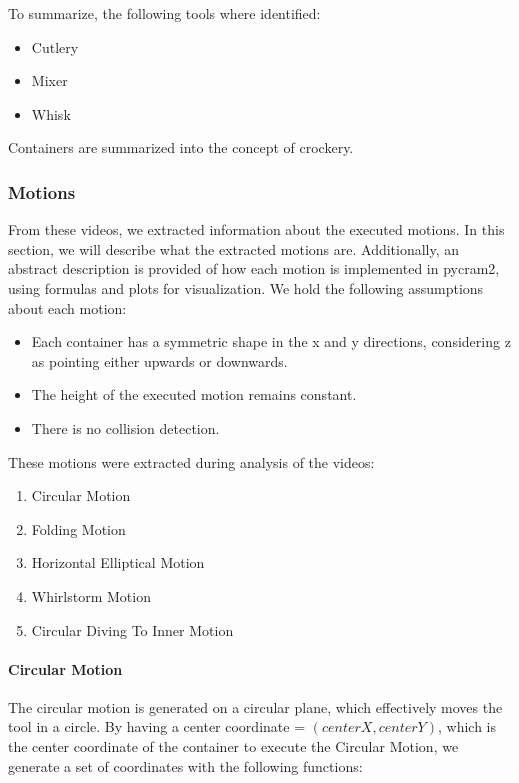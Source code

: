 To summarize, the following tools where identified: 
\begin{itemize}
  \item Cutlery
  \item Mixer
  \item Whisk
\end{itemize}

Containers are summarized into the concept of crockery. 
\subsubsection{Motions}
\label{sec:Motions}
From these videos, we extracted information about the executed motions. In this section, we will describe what the extracted motions are. 
Additionally, an abstract description is provided of how each motion is implemented in pycram2, using formulas and plots for visualization.
We hold the following assumptions about each motion:

\begin{itemize}
  \item Each container has a symmetric shape in the x and y directions, considering z as pointing either upwards or downwards.
  \item The height of the executed motion remains constant.
  \item There is no collision detection.
\end{itemize}

These motions were extracted during analysis of the videos:

\begin{enumerate}
  \item Circular Motion
  \item Folding Motion
  \item Horizontal Elliptical Motion
  \item Whirlstorm Motion
  \item Circular Diving To Inner Motion 
\end{enumerate}

\paragraph{Circular Motion}
The circular motion is generated on a circular plane, which effectively moves the tool in a circle. 
By having a center coordinate = $(centerX, centerY)$, which is the center coordinate of 
the container to execute the Circular Motion, we generate a set of coordinates
with the following functions: 

